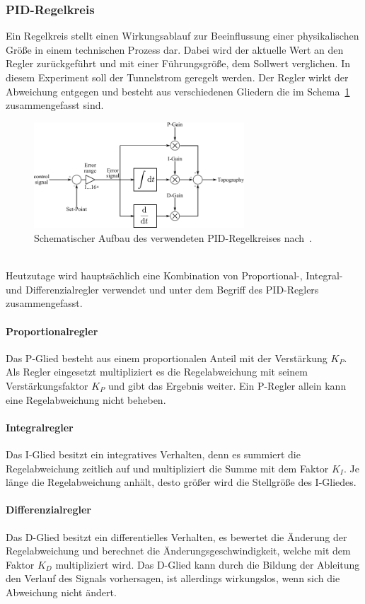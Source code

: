 \documentclass[a4paper,twoside,final]{article}
\begin{document}
\subsubsection{PID-Regelkreis}
Ein Regelkreis stellt einen Wirkungsablauf zur Beeinflussung einer physikalischen Größe in einem technischen Prozess dar. Dabei wird der aktuelle Wert an den Regler zurückgeführt und mit einer Führungsgröße, dem Sollwert verglichen. In diesem Experiment soll der Tunnelstrom geregelt werden. Der Regler wirkt der Abweichung entgegen und besteht aus verschiedenen Gliedern die im Schema~\ref{fig:PID} zusammengefasst sind.
\begin{figure}[htp]
    \centering
    \includegraphics[width=0.7\textwidth]{Bilder/PID-Regler.pdf}
    \caption{Schematischer Aufbau des verwendeten PID-Regelkreises nach~\cite{Versuchsanleitung}.}
    \label{fig:PID}
\end{figure}\\
Heutzutage wird hauptsächlich eine Kombination von Proportional-, Integral- und Differenzialregler verwendet und unter dem Begriff des PID-Reglers zusammengefasst.
\paragraph{Proportionalregler} Das P-Glied besteht aus einem proportionalen Anteil mit der Verstärkung $K_P$. Als Regler eingesetzt multipliziert es die Regelabweichung mit seinem Verstärkungsfaktor $K_P$ und gibt das Ergebnis weiter. Ein P-Regler allein kann eine Regelabweichung nicht beheben.
\paragraph{Integralregler} Das I-Glied besitzt ein integratives Verhalten, denn es summiert die Regelabweichung zeitlich auf und multipliziert die Summe mit dem Faktor $K_I$. Je länge die Regelabweichung anhält, desto größer wird die Stellgröße des I-Gliedes.
\paragraph{Differenzialregler} Das D-Glied besitzt ein differentielles Verhalten, es bewertet die Änderung der Regelabweichung und berechnet die Änderungsgeschwindigkeit, welche mit dem Faktor $K_D$ multipliziert wird. Das D-Glied kann durch die Bildung der Ableitung den Verlauf des Signals \glqq vorhersagen\grqq, ist allerdings wirkungslos, wenn sich die Abweichung nicht ändert.\\
\end{document}
